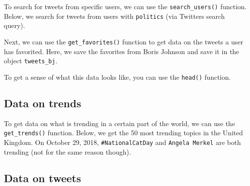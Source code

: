 \documentclass[12pt,oneside]{reedthesis}
\theoremstyle{definition}
\theoremstyle{definition}
\theoremstyle{definition}
\theoremstyle{remark}
\begin{document}
  To search for tweets from specific users, we can use the
  \texttt{search\_users()} function. Below, we search for tweets from
  users with \texttt{politics} (via Twitters search query).
  \begin{Shaded}
  \begin{Highlighting}[]
  \StringTok{ }\NormalTok{(}\NormalTok{, } \NormalTok{)}
  \end{Highlighting}
  \end{Shaded}
  Next, we can use the \texttt{get\_favorites()} function to get data on
  the tweets a user has favorited. Here, we save the favorites from Boris
  Johnson and save it in the object \texttt{tweets\_bj}.
  \begin{Shaded}
  \begin{Highlighting}[]
  \StringTok{ }\NormalTok{(}\NormalTok{)}
  \end{Highlighting}
  \end{Shaded}
  To get a sense of what this data looks like, you can use the
  \texttt{head()} function.
  \begin{Shaded}
  \begin{Highlighting}[]
  \end{Highlighting}
  \end{Shaded}
  \subsection{Data on trends}\label{data-on-trends}
  
  To get data on what is trending in a certain part of the world, we can
  use the \texttt{get\_trends()} function. Below, we get the 50 most
  trending topics in the United Kingdom. On October 29, 2018,
  \texttt{\#NationalCatDay} and \texttt{Angela\ Merkel} are both trending
  (not for the same reason though).
  \begin{Shaded}
  \begin{Highlighting}[]
  \StringTok{ }\NormalTok{(}\NormalTok{)}
  \end{Highlighting}
  \end{Shaded}
  \subsection{Data on tweets}\label{data-on-tweets}
  
\end{document}
